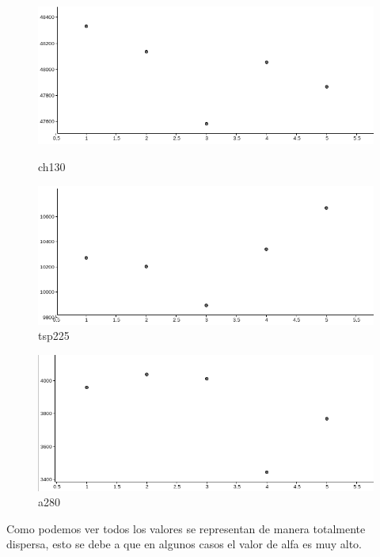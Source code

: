 \documentclass[12pt,a4paper]{article}
\begin{document}
\begin{figure}[h!t]
    \begin{minipage}[b]{0.4\linewidth}
    \centering
    \includegraphics[scale = 0.2]{ch130.png}
    \caption{ch130}
    \end{minipage}
    \hspace{0.5cm}
    \begin{minipage}[b]{0.4\linewidth}
    \centering
    \includegraphics[scale = 0.2]{tsp225.png}
    \caption{tsp225}
    \end{minipage}
\end{figure}

\begin{figure}[h!t]
\centering
\includegraphics[scale = 0.2]{a280.png}
\caption{a280}
\end{figure}

\newpage
Como podemos ver todos los valores se representan de manera totalmente dispersa, esto se debe a que en algunos casos el valor de alfa es muy alto.
\end{document}
